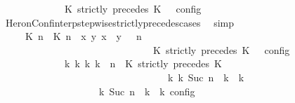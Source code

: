 \begin{isabellebody}
\ \ \ \ \ \ \ \ \ \ {\isasymturnstile}\ {\isasymPsi}\ {\isasymtriangleright}\ {\isacharparenleft}{\isacharparenleft}K\ strictly\ precedes\ K\ {\isacharhash}\ {\isasymPhi}{\isacharparenright}\ {\isasymrbrakk}\isactrlsub c\isactrlsub o\isactrlsub n\isactrlsub f\isactrlsub i\isactrlsub g{\isacartoucheclose}\isanewline
\ \ \ \ \ \ \ \ \isamarkupfalse%
\ HeronConf{\isacharunderscore}interp{\isacharunderscore}stepwise{\isacharunderscore}strictly{\isacharunderscore}precedes{\isacharunderscore}cases\ \isamarkupfalse%
\ simp\isanewline
\ \ \ \ \ \ \isamarkupfalse%
\ \isamarkupfalse%
\ {\isacartoucheopen}{\isasymrho}\ {\isasymin}\ {\isasymlbrakk}\ {\isacharparenleft}{\isacharparenleft}{\isasymlceil}{\isacharhash}\isactrlsup {\isasymle}\ K\ n{\isacharcomma}\ {\isacharhash}\isactrlsup {\isacharless}\ K\ n{\isasymrceil}\ {\isasymin}\ {\isacharparenleft}{\isasymlambda}{\isacharparenleft}x{\isacharcomma}\ y{\isacharparenright}{\isachardot}\ x\ {\isasymle}\ y{\isacharparenright}{\isacharparenright}\ {\isacharhash}\ {\isasymGamma}{\isacharparenright}{\isacharcomma}\ n\isanewline
\ \ \ \ \ \ \ \ \ \ \ \ \ \ \ \ \ \ \ \ \ \ \ \ \ \ \ \ {\isasymturnstile}\ {\isasymPsi}\ {\isasymtriangleright}\ {\isacharparenleft}{\isacharparenleft}K\ strictly\ precedes\ K\ {\isacharhash}\ {\isasymPhi}{\isacharparenright}\ {\isasymrbrakk}\isactrlsub c\isactrlsub o\isactrlsub n\isactrlsub f\isactrlsub i\isactrlsub g\isanewline
\ \ \ \ \ \ \ \ \ \ \ \ {\isasymLongrightarrow}\ {\isacharparenleft}{\isasymexists}{\isasymGamma}\isactrlsub k\ {\isasymPsi}\isactrlsub k\ {\isasymPhi}\isactrlsub k\ k{\isachardot}\ {\isacharparenleft}{\isacharparenleft}{\isasymGamma}{\isacharcomma}\ n\ {\isasymturnstile}\ {\isacharparenleft}{\isacharparenleft}K\ strictly\ precedes\ K\ {\isacharhash}\ {\isasymPsi}{\isacharparenright}\ {\isasymtriangleright}\ {\isasymPhi}{\isacharparenright}\isanewline
\ \ \ \ \ \ \ \ \ \ \ \ \ \ \ \ \ \ \ \ \ \ \ \ \ \ \ \ \ \ \ \ \ \ {\isasymhookrightarrow}\isactrlbsup k\isactrlesup \ {\isacharparenleft}{\isasymGamma}\isactrlsub k{\isacharcomma}\ Suc\ n\ {\isasymturnstile}\ {\isasymPsi}\isactrlsub k\ {\isasymtriangleright}\ {\isasymPhi}\isactrlsub k{\isacharparenright}{\isacharparenright}\isanewline
\ \ \ \ \ \ \ \ \ \ \ \ \ \ \ \ {\isasymand}\ {\isacharparenleft}{\isasymrho}\ {\isasymin}\ {\isasymlbrakk}\ {\isasymGamma}\isactrlsub k{\isacharcomma}\ Suc\ n\ {\isasymturnstile}\ {\isasymPsi}\isactrlsub k\ {\isasymtriangleright}\ {\isasymPhi}\isactrlsub k\ {\isasymrbrakk}\isactrlsub c\isactrlsub o\isactrlsub n\isactrlsub f\isactrlsub i\isactrlsub g{\isacharparenright}{\isacharparenright}{\isacartoucheclose}\isanewline

\end{isabellebody}
